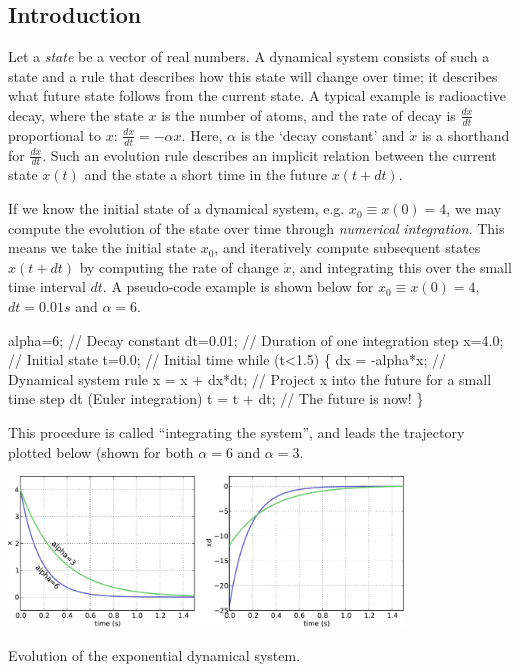 \hypertarget{page_dyn_sys_sec_dyn_sys_intro}{}\subsection{Introduction}\label{page_dyn_sys_sec_dyn_sys_intro}
Let a {\itshape state} be a vector of real numbers. A dynamical system consists of such a state and a rule that describes how this state will change over time; it describes what future state follows from the current state. A typical example is radioactive decay, where the state $x$ is the number of atoms, and the rate of decay is $\frac{dx}{dt}$ proportional to $x$\+: $ \frac{dx}{dt} = -\alpha x$. Here, $\alpha$ is the `decay constant' and $\dot{x}$ is a shorthand for $\frac{dx}{dt}$. Such an evolution rule describes an implicit relation between the current state $ x(t) $ and the state a short time in the future $x(t+dt)$.

If we know the initial state of a dynamical system, e.\+g. $x_0\equiv x(0)=4$, we may compute the evolution of the state over time through {\itshape numerical} {\itshape integration}. This means we take the initial state $ x_0$, and iteratively compute subsequent states $x(t+dt)$ by computing the rate of change $\dot{x}$, and integrating this over the small time interval $dt$. A pseudo-\/code example is shown below for $x_0\equiv x(0)=4$, $dt=0.01s$ and $\alpha=6$.


\begin{DoxyCode}
alpha=6; \textcolor{comment}{// Decay constant}
dt=0.01; \textcolor{comment}{// Duration of one integration step}
x=4.0;   \textcolor{comment}{// Initial state}
t=0.0;   \textcolor{comment}{// Initial time}
\textcolor{keywordflow}{while} (t<1.5) \{
  dx = -alpha*x;  \textcolor{comment}{// Dynamical system rule}
  x = x + dx*dt;  \textcolor{comment}{// Project x into the future for a small time step dt (Euler integration)}
  t = t + dt;     \textcolor{comment}{// The future is now!}
\}
\end{DoxyCode}


This procedure is called ``integrating the system'', and leads the trajectory plotted below (shown for both $\alpha=6$ and $\alpha=3$.


\begin{DoxyImage}
\includegraphics[height=4cm]{exponential_decay-svg}
\caption{Evolution of the exponential dynamical system.}
\end{DoxyImage}


